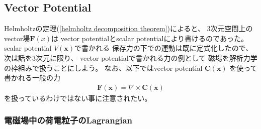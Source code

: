 \subsection{Vector Potential}

Helmholtzの定理(\ref{helmholtz decomposition theorem})によると、
$3$次元空間上のvector場$\bm{F}(x)$は
vector potentialとscalar potentialにより書けるのであった。
scalar potential $V(\bm{x})$で書かれる
保存力の下での運動は既に定式化したので、
次は話を$3$次元に限り、
vector potentialで書かれる力の例として
磁場を解析力学の枠組みで扱うことにしよう。
なお、以下ではvector potential
$\bm{C}(\bm{x})$
を使って書かれる一般の力
\begin{align}
  \bm{F}(\bm{x}) = \nabla \times \bm{C}(\bm{x})
\end{align}
を扱っているわけではない事に注意されたい。

\subsubsection{電磁場中の荷電粒子のLagrangian}

